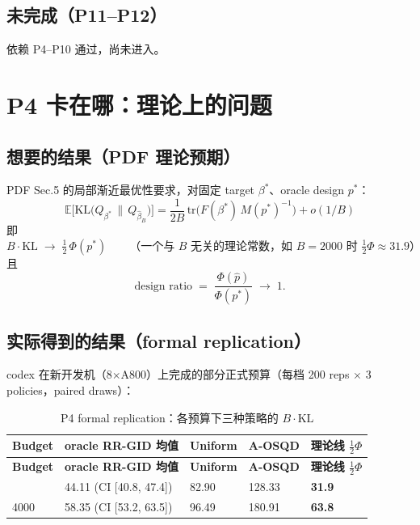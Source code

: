 \documentclass[11pt,a4paper]{ctexart}
\newcommand{\hcell}[1]{\textcolor{hlblue!85!black}{\bfseries #1}}
\begin{document}
\subsection{未完成（P11--P12）}
依赖 P4--P10 通过，尚未进入。

\section{P4 卡在哪：理论上的问题}

\subsection{想要的结果（PDF 理论预期）}
PDF Sec.5 的局部渐近最优性要求，对固定 target $\beta^*$、oracle design $p^*$：
\begin{equation}
  \mathbb{E}\big[ \mathrm{KL}\big( Q_{\beta^*}\,\lVert\, Q_{\hat{\beta}_B} \big) \big]
  = \frac{1}{2B}\,\mathrm{tr}\!\big( F(\beta^*)\, M(p^*)^{-1} \big) + o(1/B)
  \label{eq:kl}
\end{equation}
即
\[
  B\cdot\mathrm{KL} \;\longrightarrow\; \tfrac12\,\Phi(p^*)
  \qquad\text{（一个与 $B$ 无关的理论常数，如 $B=2000$ 时 $\tfrac12\Phi\approx 31.9$）}
\]
且
\[
  \text{design ratio} \;=\; \frac{\Phi(\hat p)}{\Phi(p^*)} \;\longrightarrow\; 1 .
\]

\subsection{实际得到的结果（formal replication）}
codex 在新开发机（8$\times$A800）上完成的部分正式预算（每档 200 reps $\times$ 3 policies，paired draws）：

\begin{longtable}{@{}C{1.6cm}C{4.2cm}C{2.6cm}C{2.6cm}C{2.6cm}@{}}
  \caption{P4 formal replication：各预算下三种策略的 $B\cdot\mathrm{KL}$}\label{tbl:p4formal}\\
  \toprule[1.4pt]
  \hcell{Budget} & \hcell{oracle RR-GID 均值} & \hcell{Uniform} & \hcell{A-OSQD} & \hcell{理论线 $\tfrac12\Phi$} \\
  \midrule[0.8pt]
  \endfirsthead
  \toprule[1.4pt]
  \hcell{Budget} & \hcell{oracle RR-GID 均值} & \hcell{Uniform} & \hcell{A-OSQD} & \hcell{理论线 $\tfrac12\Phi$} \\
  \midrule[0.8pt]
  \endhead
  \bottomrule[1.4pt]
   & 44.11 (CI [40.8, 47.4]) & 82.90 & 128.33 & \textbf{31.9} \\
  4000 & 58.35 (CI [53.2, 63.5]) & 96.49 & 180.91 & \textbf{63.8} \\
  \bottomrule[1.4pt]
\end{longtable}
\end{document}
